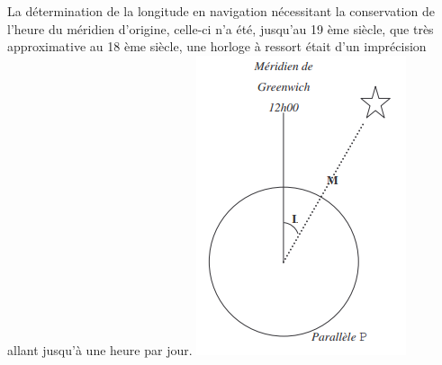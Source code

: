 \begin{multicols}{2}
\begin{enumerate}
\begin{enumerate}
La détermination de la longitude en navigation nécessitant la conservation de l'heure du méridien
d'origine, celle-ci n'a été, jusqu'au 19
ème
siècle, que très approximative au 18
ème
siècle, une horloge à
ressort était d'un imprécision allant jusqu'à une heure par jour.
\includegraphics[scale=0.9]{RepE-schemacoupepa.png}

\end{enumerate}

\end{enumerate}
\end{multicols}



